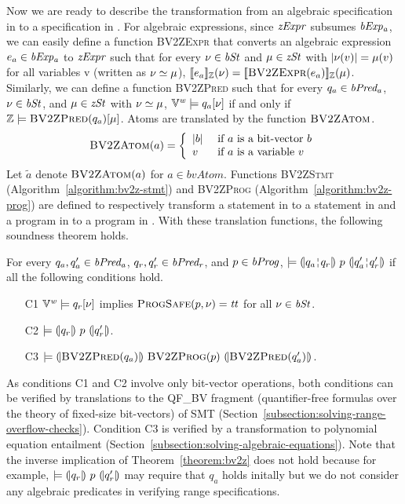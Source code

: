 Now we are ready to describe the transformation from an algebraic specification in \bvdsl to a specification in \zdsl.
For algebraic expressions, since $\mathit{zExpr}$ subsumes $\mathit{bExp_a}$, we can easily define a function \textsc{BV2ZExpr} that converts an algebraic expression $e_a \in \mathit{bExp_a}$ to $\mathit{zExpr}$ such that for every $\nu \in \mathit{bSt}$ and $\mu \in \mathit{zSt}$ with $|\nu(v)| = \mu(v)$ for all variables v (written as $\nu \simeq \mu$), $[\![{e_a}]\!]_{\mathbb{Z}}(\nu) = [\![{\textsc{BV2ZExpr}(e_a)}]\!]_{\mathbb{Z}}(\mu)$.
Similarly, we can define a function \textsc{BV2ZPred} such that for every $q_a \in \mathit{bPred_a}$, $\nu \in \mathit{bSt}$, and $\mu \in \mathit{zSt}$ with $\nu \simeq \mu$, $\mathbb{V}^{\mathit{w}} \models q_a[\nu]$ if and only if $\mathbb{Z} \models \textsc{BV2ZPred}(q_a)[\mu]$.
Atoms are translated by the function $\textsc{BV2ZAtom}$.
\[
\textsc{BV2ZAtom}(a) = \left\{
  \begin{array}{ll}
  |b| & \textmd{ if $a$ is a bit-vector $b$} \\
  v   & \textmd{ if $a$ is a variable $v$}
  \end{array} \right.
\]
Let $\tilde{a}$ denote $\textsc{BV2ZAtom}(a)$ for $a \in bvAtom$.
Functions \textsc{BV2ZStmt} (Algorithm~\ref{algorithm:bv2z-stmt}) and \textsc{BV2ZProg} (Algorithm~\ref{algorithm:bv2z-prog}) are defined to respectively transform a statement in \bvdsl to a statement in \zdsl and a program in \bvdsl to a program in \zdsl.
With these translation functions, the following soundness theorem holds.
\begin{theorem}
  For every $q_a, q_a' \in \mathit{bPred_a}$, $q_r, q_r' \in \mathit{bPred_r}$, and $p \in \mathit{bProg}$, $\models \hoaretriple{q_a \andar q_r}{p}{q_a' \andar q_r'}$ if all the following conditions hold.
  \begin{itemize}
  \item[C1] $\mathbb{V}^{\mathit{w}} \models q_r[\nu]$ implies $\textsc{ProgSafe}(p, \nu) = \mathit{tt}$ for all $\nu \in \mathit{bSt}$.
  \item[C2] $\models {(\!|}{q_r}{|\!)}~{p}~{(\!|}{q_r'}{|\!)}$.
  \item[C3] $\models {(\!|}{\textsc{BV2ZPred}(q_a)}{|\!)}~{\textsc{BV2ZProg}(p)}~{(\!|}{\textsc{BV2ZPred}(q_a')}{|\!)}$.
  \end{itemize}
  \label{theorem:bv2z}
\end{theorem}
As conditions C1 and C2 involve only bit-vector operations, both conditions can be verified by translations to the QF\_BV fragment (quantifier-free formulas over the theory of fixed-size bit-vectors) of SMT (Section~\ref{subsection:solving-range-overflow-checks}).
Condition C3 is verified by a transformation to polynomial equation entailment (Section~\ref{subsection:solving-algebraic-equations}).
Note that the inverse implication of Theorem~\ref{theorem:bv2z} does not hold because for example, $\models {(\!|}{q_r}{|\!)}~{p}~{(\!|}{q_r'}{|\!)}$ may require that $q_a$ holds initally but we do not consider any algebraic predicates in verifying range specifications.

